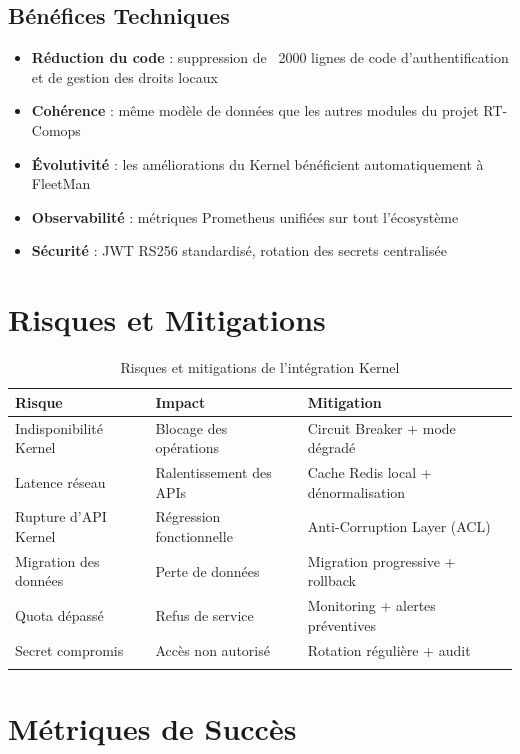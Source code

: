 \documentclass[12pt,a4paper]{report}
\begin{document}
\subsection{Bénéfices Techniques}

\begin{itemize}[leftmargin=2cm]
  \item \textbf{Réduction du code} : suppression de ~2000 lignes de code
        d'authentification et de gestion des droits locaux
  \item \textbf{Cohérence} : même modèle de données que les autres modules
        du projet RT-Comops
  \item \textbf{Évolutivité} : les améliorations du Kernel bénéficient
        automatiquement à FleetMan
  \item \textbf{Observabilité} : métriques Prometheus unifiées sur tout
        l'écosystème
  \item \textbf{Sécurité} : JWT RS256 standardisé, rotation des secrets
        centralisée
\end{itemize}

\section{Risques et Mitigations}

\begin{longtable}{p{4cm}p{5cm}p{4cm}}
\toprule
\textbf{Risque} & \textbf{Impact} & \textbf{Mitigation} \\
\midrule
\endhead
Indisponibilité Kernel & Blocage des opérations & Circuit Breaker + mode dégradé \\
Latence réseau & Ralentissement des APIs & Cache Redis local + dénormalisation \\
Rupture d'API Kernel & Régression fonctionnelle & Anti-Corruption Layer (ACL) \\
Migration des données & Perte de données & Migration progressive + rollback \\
Quota dépassé & Refus de service & Monitoring + alertes préventives \\
Secret compromis & Accès non autorisé & Rotation régulière + audit \\
\bottomrule
\caption{Risques et mitigations de l'intégration Kernel}
\end{longtable}

\section{Métriques de Succès}
\end{document}
